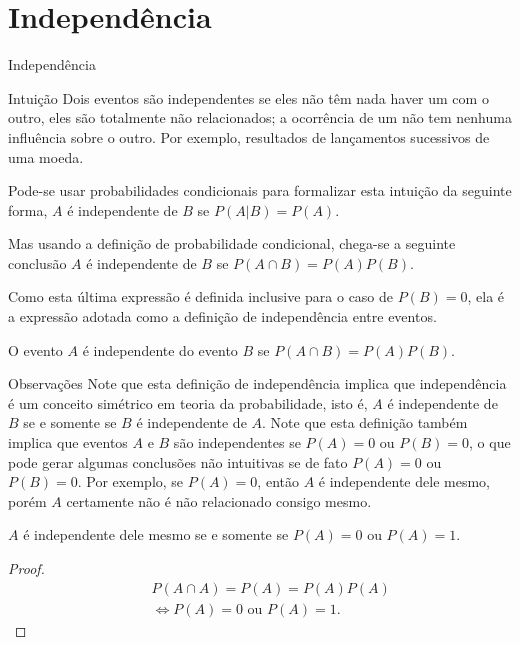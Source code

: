 \section{Independência}
\begin{frame}{Independência}
\begin{block}{Intuição}
	Dois eventos são independentes
	se eles não têm nada haver um com o
	outro, eles são totalmente não relacionados; a ocorrência de um não
	tem nenhuma influência sobre o outro. Por exemplo, resultados de lançamentos sucessivos de uma moeda.
\end{block}
%
\begin{defi}
	Pode-se usar probabilidades condicionais
	para formalizar esta intuição da seguinte forma, $A$ é
	independente de $B$ se $P(A|B)=P(A)$. 
	
	Mas usando a definição de
	probabilidade condicional, chega-se a seguinte conclusão $A$ é
	independente de $B$ se $P(A\cap B)=P(A)P(B)$. 
	
	Como esta última
	expressão é definida inclusive para o caso de $P(B)=0$, ela é a
	expressão adotada como a definição de independência entre eventos.
	\end{defi}

	\begin{defi}
		O evento $A$ é independente do evento $B$ se $P(A\cap B)=P(A)P(B)$.
	\end{defi}
\end{frame}
%






\begin{frame}
\begin{block}{Observações}
Note que esta definição de independência implica que independência é
um conceito simétrico em teoria da probabilidade, isto é, $A$ é
independente de $B$ se e somente se $B$ é independente de $A$. Note
que esta definição também implica que eventos $A$ e $B$ são
independentes se $P(A)=0$ ou $P(B)=0$, o que pode gerar algumas
conclusões não intuitivas se de fato $P(A)=0$ ou $P(B)=0$. Por
exemplo, se $P(A)=0$, então $A$ é independente dele mesmo, porém $A$
certamente não é não relacionado consigo mesmo.
\end{block}

\begin{teo}
	$A$ é independente dele mesmo se e somente se $P(A)=0$ ou $P(A)=1$.
\end{teo}
\begin{proof}
\begin{eqnarray}
& & P(A\cap A)=P(A)=P(A)P(A) \nonumber\\
& & \Leftrightarrow P(A)=0 \mbox{ ou } P(A)=1.\nonumber
\end{eqnarray}
\end{proof}

\end{frame}

